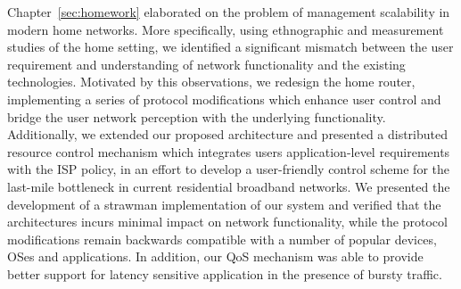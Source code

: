 Chapter~\ref{sec:homework} elaborated on the problem of management scalability
in modern home networks. More specifically, using ethnographic and measurement
studies of the home setting, we identified a significant mismatch between the
user requirement and understanding of network functionality and the existing
technologies. Motivated by this observations, we redesign the home router,
implementing a series of protocol modifications which enhance user control and
bridge the user network perception with the underlying functionality.
Additionally, we extended our proposed architecture and presented a distributed
resource control mechanism which integrates users application-level requirements
with the ISP policy, in an effort to develop a user-friendly control scheme for
the last-mile bottleneck in current residential broadband networks. We presented
the development of a strawman implementation of our system and verified that the
architectures incurs minimal impact on network functionality, while the protocol
modifications remain backwards compatible with a number of popular devices,
OSes and applications. In addition, our QoS mechanism was able to provide better
support for latency sensitive application in the presence of bursty traffic. 

